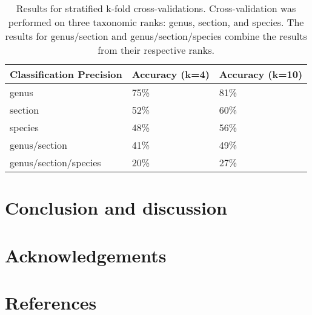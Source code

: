 \documentclass[review,3p,twocolumn]{elsarticle}
\begin{document}
\begin{table*}[t]\footnotesize
    \caption{Results for stratified k-fold cross-validations. Cross-validation was performed on three taxonomic ranks: genus, section, and species. The results for genus/section and genus/section/species combine the results from their respective ranks.}
    \begin{center}
    \begin{tabular}{lp{3cm}p{3cm}}
    \toprule
    \textbf{Classification Precision} & \textbf{Accuracy (k=4)} & \textbf{Accuracy (k=10)} \\
    \midrule
    genus                   & 75\%    & 81\% \\
    section                 & 52\%    & 60\% \\
    species                 & 48\%    & 56\% \\
    genus/section           & 41\%    & 49\% \\
    genus/section/species   & 20\%    & 27\% \\
    \bottomrule
    \end{tabular}
    \end{center}
    \label{tbl:x-validation-results}
\end{table*}

\section{Conclusion and discussion}
\label{sect:conclusion}

\lipsum[1]

\section*{Acknowledgements}

\lipsum[1]



\section*{References}

%

%
\end{document}
